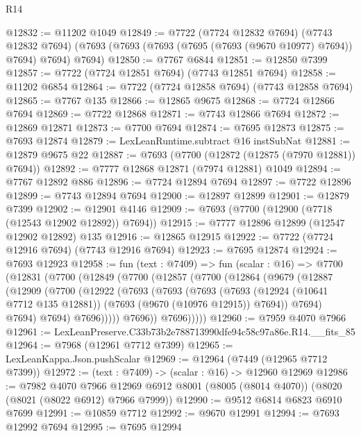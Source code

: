 \begin{lexlean}{R14}
\begin{coremodule}
@12832 := @11202 @1049
@12849 := @7722
    (@7724 @12832 @7694)
    (@7743 @12832 @7694)
    (@7693 (@7693 (@7693 (@7695 (@7693 (@9670 @10977) @7694)) @7694) @7694) @7694)
@12850 := @7767 @6844
@12851 := @12850 @7399
@12857 := @7722 (@7724 @12851 @7694) (@7743 @12851 @7694)
@12858 := @11202 @6854
@12864 := @7722 (@7724 @12858 @7694) (@7743 @12858 @7694)
@12865 := @7767 @135
@12866 := @12865 @9675
@12868 := @7724 @12866 @7694
@12869 := @7722 @12868
@12871 := @7743 @12866 @7694
@12872 := @12869 @12871
@12873 := @7700 @7694
@12874 := @7695 @12873
@12875 := @7693 @12874
@12879 := LexLeanRuntime.subtract @16 instSubNat
@12881 := @12879 @9675 @22
@12887 := @7693 (@7700 (@12872 (@12875 (@7970 @12881)) @7694))
@12892 := @7777 @12868 @12871 (@7974 @12881) @1049
@12894 := @7767 @12892 @886
@12896 := @7724 @12894 @7694
@12897 := @7722 @12896
@12899 := @7743 @12894 @7694
@12900 := @12897 @12899
@12901 := @12879 @7399
@12902 := @12901 @4146
@12909 := @7693 (@7700 (@12900 (@7718 (@12543 @12902 @12892)) @7694))
@12915 := @7777 @12896 @12899 (@12547 @12902 @12892) @135
@12916 := @12865 @12915
@12922 := @7722 (@7724 @12916 @7694) (@7743 @12916 @7694)
@12923 := @7695 @12874
@12924 := @7693 @12923
@12958 := fun (text : @7409) =>
  fun (scalar : @16) =>
  @7700
    (@12831
      (@7700
        (@12849
          (@7700
            (@12857
              (@7700
                (@12864
                  (@9679
                    (@12887
                      (@12909
                        (@7700
                          (@12922
                            (@7693
                              (@7693
                                (@7693
                                  (@7693
                                    (@12924 (@10641 @7712 @135 @12881))
                                    (@7693 (@9670 (@10976 @12915)) @7694))
                                  @7694)
                                @7694)
                              @7694)
                            @7696)))))
                  @7696))
              @7696)))))
@12960 := @7959 @4070 @7966
@12961 := LexLeanPreserve.C33b73b2e788713990dfe94c58c97a86e.R14.__fits_85
@12964 := @7968 (@12961 @7712 @7399)
@12965 := LexLeanKappa.Json.pushScalar
@12969 := @12964 (@7449 (@12965 @7712 @7399))
@12972 := (text : @7409) -> (scalar : @16) -> @12960 @12969
@12986 := @7982
    @4070
    @7966
    @12969
    @6912
    @8001
    (@8005 (@8014 @4070))
    (@8020 (@8021 (@8022 @6912) @7966 @7999))
@12990 := @9512 @6814 @6823 @6910 @7699
@12991 := @10859 @7712
@12992 := @9670 @12991
@12994 := @7693 @12992 @7694
@12995 := @7695 @12994

\end{coremodule}
\end{lexlean}
